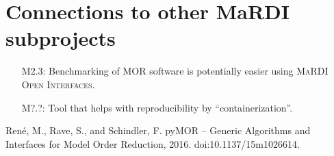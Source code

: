 \documentclass{mmposter}
\newcommand{\OIF}{\textsc{MaRDI Open Interfaces}\xspace}
\begin{document}
\section*{Connections to other MaRDI subprojects}

\begin{itemize}[align=left]
  \item[\color{CEmphasis1}M2.3:] Benchmarking of MOR software is potentially
    easier using \OIF{}.
  \item[\color{CEmphasis1}M?.?:] Tool that helps with reproducibility
    by ``containerization''.
\end{itemize}

\begin{thebibliography}{1}
  \setlength{\itemsep}{1pt}
  \setlength{\parskip}{1.5pt}

  \scriptsize{

  Ren{\'{e}}, M., Rave, S., and Schindler, F.
  \newblock pyMOR -- Generic Algorithms and Interfaces for Model Order Reduction, 2016.
  \newblock doi:10.1137/15m1026614.
  }
\end{thebibliography}
\end{document}
